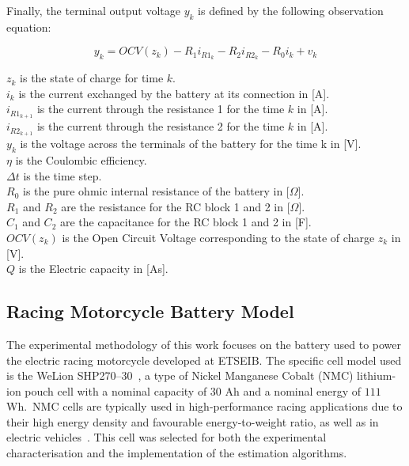Finally, the terminal output voltage $y_k$ is defined by the following observation equation:

\begin{equation}
    y_k = OCV(z_k) - R_1 i_{R1_{k}} - R_2 i_{R2_{k}} - R_0 i_k + v_k
    \label{eq:y_kESC}
\end{equation}

$z_k$ is the state of charge for time $k$.\\
$i_k$ is the current exchanged by the battery at its connection in [A].\\
$i_{R1_{k+1}}$ is the current through the resistance 1 for the time $k$ in [A].\\
$i_{R2_{k+1}}$ is the current through the resistance 2 for the time $k$ in [A].\\
$y_k$ is the voltage across the terminals of the battery for the time k in [V].\\
$\eta$ is the Coulombic efficiency.\\
$\Delta t$ is the time step.\\
$R_0$ is the pure ohmic internal resistance of the battery in [$\Omega$].\\
$R_1$ and $R_2$ are the resistance for the RC block 1 and 2 in [$\Omega$].\\
$C_1$ and $C_2$ are the capacitance for the RC block 1 and 2 in [F].\\
$OCV(z_k)$ is the Open Circuit Voltage corresponding to the state of charge $z_k$ in [V].\\
$Q$ is the Electric capacity in [As].

\subsection{Racing Motorcycle Battery Model}

The experimental methodology of this work focuses on the battery used to power the electric racing motorcycle developed at ETSEIB. 
The specific cell model used is the WeLion SHP270--30~\cite{welion2026shp270}, a type of Nickel Manganese Cobalt (\acs{NMC}) 
lithium-ion pouch cell with a nominal capacity of $30$ Ah and a nominal energy of $111$ Wh.~\acs{NMC} cells are typically 
used in high-performance racing applications due to their high energy density and favourable energy-to-weight ratio, 
as well as in electric vehicles~\cite{HassanTantaNMC}.
This cell was selected for both the experimental characterisation and the implementation of the estimation algorithms.

